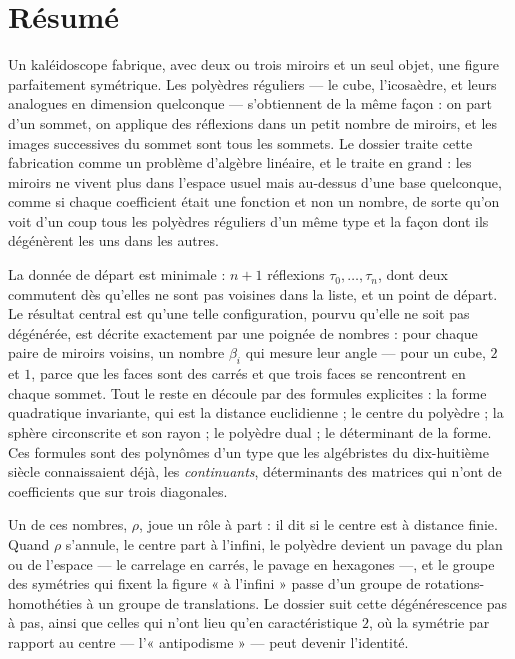 \documentclass[11pt,a4paper]{article}
\begin{document}
\section*{Résumé}

\begin{resume}
Un kaléidoscope fabrique, avec deux ou trois miroirs et un seul objet, une
figure parfaitement symétrique. Les polyèdres réguliers --- le cube,
l'icosaèdre, et leurs analogues en dimension quelconque --- s'obtiennent de la
même façon : on part d'un sommet, on applique des réflexions dans un petit nombre
de miroirs, et les images successives du sommet sont tous les sommets. Le
dossier traite cette fabrication comme un problème d'algèbre linéaire, et le
traite en grand : les miroirs ne vivent plus dans l'espace usuel mais au-dessus
d'une base quelconque, comme si chaque coefficient était une fonction et non un
nombre, de sorte qu'on voit d'un coup tous les polyèdres réguliers d'un même
type et la façon dont ils dégénèrent les uns dans les autres.

La donnée de départ est minimale : $n + 1$ réflexions $\tau_0, \ldots,
\tau_n$, dont deux commutent dès qu'elles ne sont pas voisines dans la liste,
et un point de départ. Le résultat central est qu'une telle configuration,
pourvu qu'elle ne soit pas dégénérée, est décrite exactement par une poignée de
nombres : pour chaque paire de miroirs voisins, un nombre $\beta_i$ qui mesure
leur angle --- pour un cube, $2$ et $1$, parce que les faces sont des carrés
et que trois faces se rencontrent en chaque sommet. Tout le reste en découle
par des formules explicites : la forme quadratique invariante, qui est la
distance euclidienne ; le centre du polyèdre ; la sphère circonscrite et son
rayon ; le polyèdre dual ; le déterminant de la forme. Ces formules sont des
polynômes d'un type que les algébristes du dix-huitième
siècle connaissaient déjà, les \emph{continuants}, déterminants des matrices
qui n'ont de coefficients que sur trois diagonales.

Un de ces nombres, $\rho$, joue un rôle à part : il dit si le centre est à
distance finie. Quand $\rho$ s'annule, le centre part à l'infini, le polyèdre
devient un pavage du plan ou de l'espace --- le carrelage en carrés, le
pavage en hexagones ---, et le groupe des symétries qui fixent la figure
« à l'infini » passe d'un groupe de rotations-homothéties à un groupe de
translations. Le dossier suit cette dégénérescence pas à pas, ainsi que celles
qui n'ont lieu qu'en caractéristique $2$, où la symétrie par rapport au centre
--- l'« antipodisme » --- peut devenir l'identité.


\end{resume}
\end{document}
